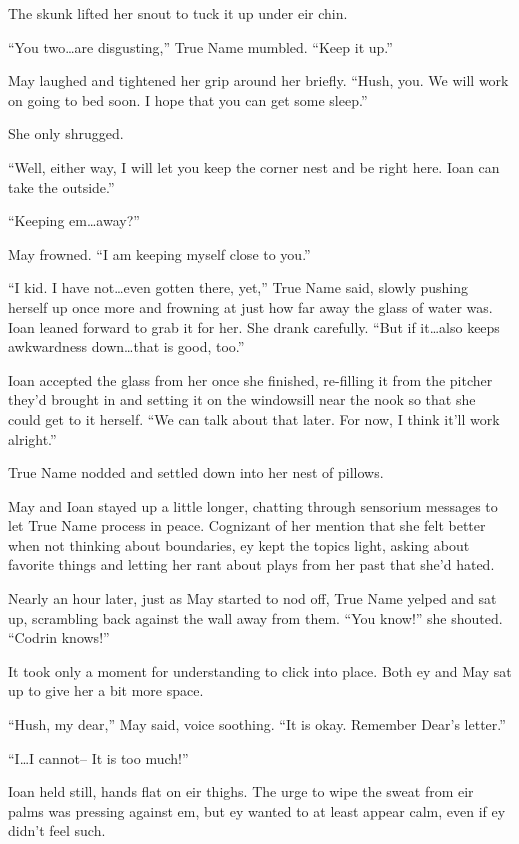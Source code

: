 The skunk lifted her snout to tuck it up under eir chin.

``You two\ldots are disgusting,'' True Name mumbled. ``Keep it up.''

May laughed and tightened her grip around her briefly. ``Hush, you. We will work on going to bed soon. I hope that you can get some sleep.''

She only shrugged.

``Well, either way, I will let you keep the corner nest and be right here. Ioan can take the outside.''

``Keeping em\ldots away?''

May frowned. ``I am keeping myself close to you.''

``I kid. I have not\ldots even gotten there, yet,'' True Name said, slowly pushing herself up once more and frowning at just how far away the glass of water was. Ioan leaned forward to grab it for her. She drank carefully. ``But if it\ldots also keeps awkwardness down\ldots that is good, too.''

Ioan accepted the glass from her once she finished, re-filling it from the pitcher they'd brought in and setting it on the windowsill near the nook so that she could get to it herself. ``We can talk about that later. For now, I think it'll work alright.''

True Name nodded and settled down into her nest of pillows.

May and Ioan stayed up a little longer, chatting through sensorium messages to let True Name process in peace. Cognizant of her mention that she felt better when not thinking about boundaries, ey kept the topics light, asking about favorite things and letting her rant about plays from her past that she'd hated.

Nearly an hour later, just as May started to nod off, True Name yelped and sat up, scrambling back against the wall away from them. ``You know!'' she shouted. ``Codrin knows!''

It took only a moment for understanding to click into place. Both ey and May sat up to give her a bit more space.

``Hush, my dear,'' May said, voice soothing. ``It is okay. Remember Dear's letter.''

``I\ldots I cannot-- It is too much!''

Ioan held still, hands flat on eir thighs. The urge to wipe the sweat from eir palms was pressing against em, but ey wanted to at least appear calm, even if ey didn't feel such.

